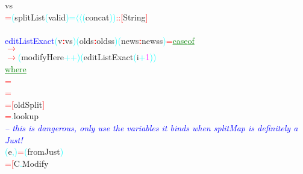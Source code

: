 {\rm{}vs}\\\hsspace \textcolor{red}{=}\hsspace \textcolor{cyan}{(}{\rm{}splitList}\hsspace \textcolor{cyan}{(}{\rm{}valid}\textcolor{cyan}{)}\hsspace \textcolor{cyan}{=\ensuremath{\langle}\ensuremath{\langle}}\hsspace \textcolor{cyan}{(}{\rm{}concat}\textcolor{cyan}{)}\textcolor{cyan}{)}\hsspace \textcolor{red}{::}\hsspace \textcolor{red}{[}{\rm{}String}\textcolor{red}{]}\\\\\textcolor{blue}{editListExact}\hsspace \textcolor{cyan}{(}{\rm{}v}\textcolor{red}{{\bf{}:}}{\rm{}vs}\textcolor{cyan}{)}\hsspace \textcolor{cyan}{(}{\rm{}olds}\textcolor{red}{{\bf{}:}}{\rm{}oldss}\textcolor{cyan}{)}\hsspace \textcolor{cyan}{(}{\rm{}news}\textcolor{red}{{\bf{}:}}{\rm{}newss}\textcolor{cyan}{)}\hsspace \textcolor{red}{=}\hsspace \textcolor{green}{\underline{case}}\hsspace \textcolor{green}{\underline{of}}\\\hsspace \textcolor{red}{\ensuremath{\rightarrow}}\\\hsspace \textcolor{red}{\ensuremath{\rightarrow}}\hsspace \textcolor{cyan}{(}{\rm{}modifyHere}\textcolor{cyan}{++}\textcolor{cyan}{)}\hsspace \textcolor{cyan}{(}{\rm{}editListExact}\hsspace \textcolor{cyan}{(}{\rm{}i}\textcolor{cyan}{+}\textcolor{magenta}{1}\textcolor{cyan}{)}\textcolor{cyan}{)}\\\hstab \textcolor{green}{\underline{where}}\\\hsspace \hsspace \hsspace \hsspace \hsspace \textcolor{red}{=}\\\hsspace \hsspace \hsspace \hsspace \hsspace \textcolor{red}{=}\\\hsspace \hsspace \hsspace \textcolor{red}{=}\hsspace \textcolor{red}{[}{\rm{}oldSplit}\textcolor{red}{]}\\\hsspace \hsspace \hsspace \hsspace \hsspace \textcolor{red}{=}\textcolor{cyan}{.}{\rm{}lookup}\\\hstab \textcolor{blue}{{\it{}-- this is dangerous, only use the variables it binds when splitMap is definitely a Just!}}\\\hstab \textcolor{cyan}{(}{\rm{}e}\textcolor{cyan}{,}\textcolor{cyan}{)}\hsspace \hsspace \hsspace \textcolor{red}{=}\hsspace \textcolor{cyan}{(}{\rm{}fromJust}\textcolor{cyan}{)}\\\hsspace \hsspace \hsspace \textcolor{red}{=}\hsspace \textcolor{red}{[}{\rm{}C}\textcolor{cyan}{.}{\rm{}Modify}\hsspace 